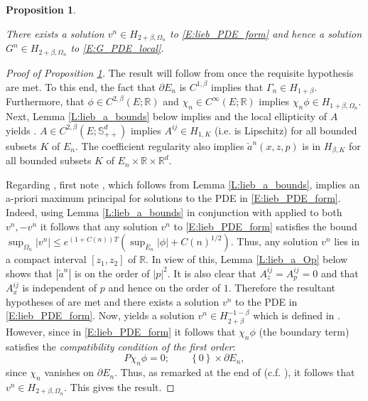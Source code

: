\documentclass[11pt, letterpaper]{amsart}
\newtheorem{proposition}[theorem]{Proposition}
\theoremstyle{definition}
\theoremstyle{remark}
\numberwithin{equation}{section}
\newcommand{\reals}{\mathbb R}
\newcommand{\cbra}[1]{\left\{#1\right\}}
\newcommand{\ol}[1]{\overline{#1}}
\begin{document}
\begin{proposition}\label{P:local_pde_exist}

There exists a solution $v^n\in H_{2+\beta,\Omega_n}$ to \eqref{E:lieb_PDE_form} and hence a solution $G^n\in H_{2+\beta,\Omega_n}$ to \eqref{E:G_PDE_local}.

\end{proposition}

\begin{proof}[Proof of Proposition \ref{P:local_pde_exist}]

The result will follow from \cite[Theorem 12.16]{MR1465184} once the requisite hypothesis are met.  To this end, the fact that $\partial E_n$ is $C^{1,\beta}$ implies that $\Gamma_n \in H_{1+\beta}$.  Furthermore, that $\phi\in C^{2,\beta}(E;\reals)$ and $\chi_n\in C^{\infty}(E;\reals)$ implies  $\chi_n\phi\in H_{1+\beta,\Omega_n}$.  Next, Lemma \ref{L:lieb_a_bounds} below implies \cite[Equation (12.26)]{MR1465184} and the local ellipticity of $A$ yields \cite[Equation (12.25a)]{MR1465184}. $A\in C^{2,\beta}(E;\mathbb{S}^d_{++})$ implies $A^{ij} \in H_{1,K}$ (i.e. is Lipschitz) for all bounded subsets $K$ of $E_n$.  The coefficient regularity also implies  $\check{a}^n(x,z,p)$ is in $H_{\beta,K}$ for all bounded subsets $K$ of $E_n\times \reals\times\reals^d$.

Regarding \cite[Equation (12.27)]{MR1465184}, first note \cite[Equation (12.26)]{MR1465184}, which follows from Lemma \ref{L:lieb_a_bounds}, implies an a-priori maximum principal for solutions to the PDE in \eqref{E:lieb_PDE_form}. Indeed, using Lemma \ref{L:lieb_a_bounds} in conjunction with \cite[Theorem 9.5]{MR1465184} applied to both $v^n,-v^n$ it follows that any solution $v^n$ to \eqref{E:lieb_PDE_form} satisfies the bound $\sup_{\Omega_n} |v^n| \leq e^{(1+C(n))T}\left(\sup_{\ol{E}_n}|\phi| + C(n)^{1/2}\right)$. Thus, any solution $v^n$ lies in a compact interval $[z_1,z_2]$ of $\reals$.  In view of this, Lemma \ref{L:lieb_a_Op} below shows that $|\check{a}^n|$ is on the order of $|p|^2$.  It is also clear that $A^{ij}_z = A^{ij}_p = 0$ and that $A^{ij}_x$ is independent of $p$ and hence on the order of $1$.  Therefore the resultant hypotheses of \cite[Theorem 12.16]{MR1465184} are met and there exists a solution $v^n$ to the PDE in \eqref{E:lieb_PDE_form}.   Now, \cite[Theorem 12.16]{MR1465184} yields a solution $v^n \in H^{-1-\beta}_{2+\beta}$ which is defined in \cite[Chapter 4]{MR1465184}.  However, since in \eqref{E:lieb_PDE_form} it follows that $\chi_n\phi$ (the boundary term) satisfies the \emph{compatibility condition of the first order}:
\begin{equation*}
P\chi_n\phi = 0;\qquad \cbra{0}\times \partial E_n,
\end{equation*}
since $\chi_n$ vanishes on $\partial E_n$.  Thus, as remarked at the end of \cite[Theorem 12.16]{MR1465184} (c.f. \cite[Theorems 5.14,8.2]{MR1465184}), it follows that $v^n \in H_{2+\beta,\Omega_n}$.  This gives the result.

\end{proof}
\end{document}
